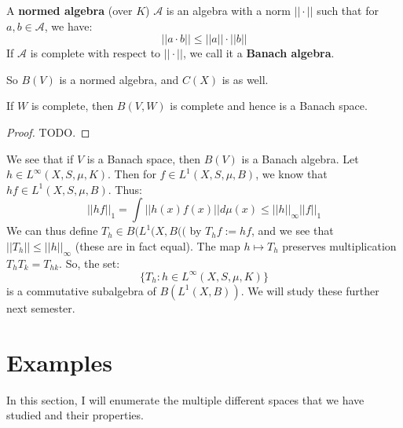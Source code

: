 	\begin{definition}
		A \textbf{normed algebra} (over $K$) $\mathcal A$ is an algebra with a norm $||\cdot||$ such that for $a, b\in
		\mathcal A$, we have:
		$$
			||a\cdot b||\leq ||a||\cdot||b||
		$$
		If $\mathcal A$ is complete with respect to $||\cdot||$, we call it a \textbf{Banach algebra}.
	\end{definition}
	
	So $B(V)$ is a normed algebra, and $C(X)$ is as well. 
	
	\begin{prop}
		If $W$ is complete, then $B(V, W)$ is complete and hence is a Banach space. 
	\end{prop}
	
	\begin{proof}
		TODO.
	\end{proof}
	
	We see that if $V$ is a Banach space, then $B(V)$ is a Banach algebra. Let $h\in L^\infty (X, S, \mu, K)$. Then for $f\in
	L^1(X, S, \mu, B)$, we know that $hf\in L^1(X, S, \mu, B)$. Thus:
	$$
		||hf||_1 = \int ||h(x)f(x)||d\mu(x)\leq ||h||_\infty ||f||_1
	$$
	We can thus define $T_h\in B(L^1(X, B(($ by $T_hf := hf$, and we see that $||T_h||\leq ||h||_\infty$ (these are in fact 
	equal). The map $h\mapsto T_h$ preserves multiplication $T_hT_k = T_{hk}$. So, the set:
	$$
		\{T_h : h\in L^\infty(X, S, \mu, K)\}
	$$
	is a commutative subalgebra of $B(L^1(X, B))$. We will study these further next semester.
	
\section{Examples}

	In this section, I will enumerate the multiple different spaces that we have studied and their properties.
	

